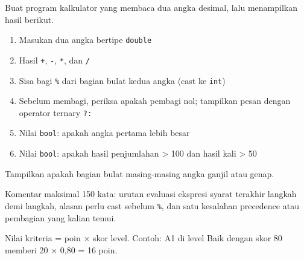 \documentclass[a4paper]{article}
\begin{document}
Buat program kalkulator yang membaca dua angka desimal, lalu menampilkan hasil berikut.
\begin{enumerate}
\item Masukan dua angka bertipe \texttt{double}
\item Hasil \texttt{+}, \texttt{-}, \texttt{*}, dan \texttt{/}
\item Sisa bagi \texttt{\%} dari bagian bulat kedua angka (cast ke \texttt{int})
\item Sebelum membagi, periksa apakah pembagi nol; tampilkan pesan dengan operator ternary \texttt{?:}
\item Nilai \texttt{bool}: apakah angka pertama lebih besar
\item Nilai \texttt{bool}: apakah hasil penjumlahan > 100 dan hasil kali > 50
\end{enumerate}
\begin{Contoh}
Tampilkan apakah bagian bulat masing-masing angka ganjil atau genap.
\end{Contoh}
Komentar maksimal 150 kata: urutan evaluasi ekspresi syarat terakhir langkah demi langkah, alasan perlu cast sebelum \texttt{\%}, dan satu kesalahan precedence atau pembagian yang kalian temui.

\par\vspace{4pt}\par\vspace{6pt}
Nilai kriteria = poin × skor level. Contoh: A1 di level Baik dengan skor 80 memberi 20 × 0,80 = 16 poin.
\end{document}
